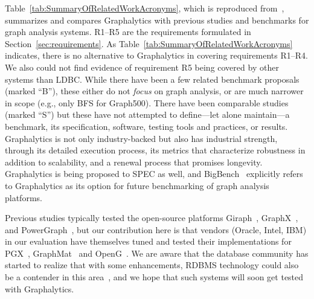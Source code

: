 Table~\ref{tab:SummaryOfRelatedWorkAcronyms}, which is reproduced from~\cite{DBLP:journals/pvldb/IosupHNHPMCCSATXNB16}, summarizes and compares Graphalytics with previous studies and benchmarks for graph analysis systems. R1--R5 are the requirements formulated in Section~\ref{sec:requirements}. 
As Table~\ref{tab:SummaryOfRelatedWorkAcronyms} indicates, there is no alternative to Graphalytics in covering requirements R1--R4. We also could not find evidence of requirement R5 being covered by other systems than LDBC.
While there have been a few related benchmark proposals (marked ``B''), these either do not {\em focus} on graph analysis, or are much narrower in scope (e.g., only BFS for Graph500).
There have been comparable studies (marked ``S'') but these have not attempted to define---let alone maintain---a benchmark, its specification, software, testing tools and practices, or results.
Graphalytics is not only industry-backed but also has industrial strength, through its detailed execution process, its metrics that characterize robustness in addition to scalability, and a renewal process that promises longevity.
Graphalytics is being proposed to SPEC as well, and BigBench~\cite{DBLP:conf/sigmod/GhazalRHRPCJ13,DBLP:conf/sigmod/RablFDJG15} explicitly refers to Graphalytics as its option for future benchmarking of graph analysis platforms. 


Previous studies typically tested the open-source platforms Giraph~\cite{DBLP:books/sp/SOAK2016}, GraphX~\cite{xin2013graphx}, and 
PowerGraph~\cite{gonzalez2012powergraph}, but our contribution here is that vendors (Oracle, Intel, IBM) in our evaluation have themselves tuned and tested their implementations for PGX~\cite{DBLP:conf/sc/HongDMLVC15}, GraphMat~\cite{sundaram2015graphmat} and OpenG~\cite{DBLP:conf/sc/NaiXTKL15}. We are aware that the database community has started to realize that with some enhancements, RDBMS technology could also be a contender in this area~\cite{fan2015case,jindal2014vertexica}, and we hope that such systems will soon get tested with Graphalytics. 

